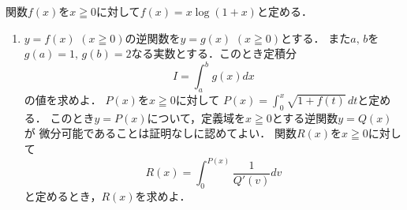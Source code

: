 \documentclass[../../main.tex]{subfiles}
\begin{document}
関数$f(x)$を$x\geqq0$に対して$f(x)=x\log(1+x)$と定める．
\begin{enumerate}
  $\displaystyle\int x\log(1+x)dx$を求めよ．
  \item$y=f(x)$ $(x\geqq0)$の逆関数を$y=g(x)$ $(x\geqq0)$とする．
    また$a, \, b$を$g(a)=1, \, g(b)=2$なる実数とする．このとき定積分
    \[ I=\int_a^bg(x)dx \]
    の値を求めよ．
  $P(x)$を$x\geqq0$に対して
    $\displaystyle P(x)=\int_0^x\sqrt{1+f(t)} \, dt$と定める．
    このとき$y=P(x)$について，定義域を$x\geqq0$とする逆関数$y=Q(x)$が
    微分可能であることは証明なしに認めてよい．
    関数$R(x)$を$x\geqq0$に対して
    \[ R(x)=\int_0^{P(x)}\frac{1}{Q'(v)}dv \]
    と定めるとき，$R(x)$を求めよ．
\end{enumerate}
\end{document}
